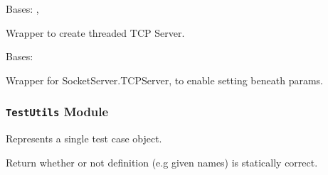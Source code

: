 \documentclass[a4paper,11pt,openany]{sphinxmanual}
\begin{document}

\begin{fulllineitems}
\label{ref-manual/XrdTest:XrdTest.TCPServer.ThreadedTCPServer}
Bases: , {\hyperref[ref-manual/XrdTest:XrdTest.TCPServer.XrdTCPServer]{}}

Wrapper to create threaded TCP Server.

\end{fulllineitems}


\begin{fulllineitems}
\label{ref-manual/XrdTest:XrdTest.TCPServer.XrdTCPServer}
Bases: 

Wrapper for SocketServer.TCPServer, to enable setting beneath params.

\begin{fulllineitems}
\label{ref-manual/XrdTest:XrdTest.TCPServer.XrdTCPServer.allow_reuse_address}
\end{fulllineitems}


\end{fulllineitems}



\subsubsection{\texttt{TestUtils} Module}
\label{ref-manual/XrdTest:module-XrdTest.TestUtils}\label{ref-manual/XrdTest:testutils-module}

\begin{fulllineitems}
\label{ref-manual/XrdTest:XrdTest.TestUtils.TestCase}
Represents a single test case object.

\begin{fulllineitems}
\label{ref-manual/XrdTest:XrdTest.TestUtils.TestCase.validateStatic}
Return whether or not definition (e.g given names) is statically correct.

\end{fulllineitems}


\end{fulllineitems}
\end{document}
